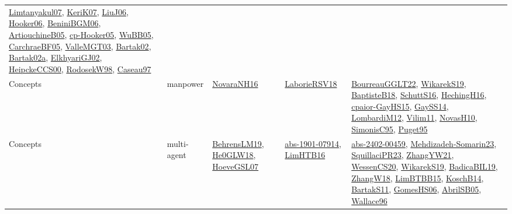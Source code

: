 {\begin{longtable}{lp{3cm}>{\raggedright}p{6cm}>{\raggedright}p{6cm}p{8cm}}
\href{papers/Limtanyakul07.pdf}{Limtanyakul07}\cite{Limtanyakul07}, \href{papers/KeriK07.pdf}{KeriK07}\cite{KeriK07}, \href{papers/LiuJ06.pdf}{LiuJ06}\cite{LiuJ06}, \href{articles/Hooker06.pdf}{Hooker06}\cite{Hooker06}, \href{papers/BeniniBGM06.pdf}{BeniniBGM06}\cite{BeniniBGM06}, \href{papers/ArtiouchineB05.pdf}{ArtiouchineB05}\cite{ArtiouchineB05}, \href{papers/cp-Hooker05.pdf}{cp-Hooker05}\cite{cp-Hooker05}, \href{papers/WuBB05.pdf}{WuBB05}\cite{WuBB05}, \href{papers/CarchraeBF05.pdf}{CarchraeBF05}\cite{CarchraeBF05}, \href{papers/ValleMGT03.pdf}{ValleMGT03}\cite{ValleMGT03}, \href{papers/Bartak02.pdf}{Bartak02}\cite{Bartak02}, \href{papers/Bartak02a.pdf}{Bartak02a}\cite{Bartak02a}, \href{papers/ElkhyariGJ02.pdf}{ElkhyariGJ02}\cite{ElkhyariGJ02}, \href{articles/HeipckeCCS00.pdf}{HeipckeCCS00}\cite{HeipckeCCS00}, \href{papers/RodosekW98.pdf}{RodosekW98}\cite{RodosekW98}, \href{papers/Caseau97.pdf}{Caseau97}\cite{Caseau97}\\
Concepts & manpower & \href{articles/NovaraNH16.pdf}{NovaraNH16}\cite{NovaraNH16} & \href{articles/LaborieRSV18.pdf}{LaborieRSV18}\cite{LaborieRSV18} & \href{articles/BourreauGGLT22.pdf}{BourreauGGLT22}\cite{BourreauGGLT22}, \href{articles/WikarekS19.pdf}{WikarekS19}\cite{WikarekS19}, \href{articles/BaptisteB18.pdf}{BaptisteB18}\cite{BaptisteB18}, \href{papers/SchuttS16.pdf}{SchuttS16}\cite{SchuttS16}, \href{papers/HechingH16.pdf}{HechingH16}\cite{HechingH16}, \href{papers/cpaior-GayHS15.pdf}{cpaior-GayHS15}\cite{cpaior-GayHS15}, \href{papers/GaySS14.pdf}{GaySS14}\cite{GaySS14}, \href{articles/LombardiM12.pdf}{LombardiM12}\cite{LombardiM12}, \href{papers/Vilim11.pdf}{Vilim11}\cite{Vilim11}, \href{articles/NovasH10.pdf}{NovasH10}\cite{NovasH10}, \href{papers/SimonisC95.pdf}{SimonisC95}\cite{SimonisC95}, \href{papers/Puget95.pdf}{Puget95}\cite{Puget95}\\
Concepts & multi-agent & \href{papers/BehrensLM19.pdf}{BehrensLM19}\cite{BehrensLM19}, \href{papers/He0GLW18.pdf}{He0GLW18}\cite{He0GLW18}, \href{papers/HoeveGSL07.pdf}{HoeveGSL07}\cite{HoeveGSL07} & \href{articles/abs-1901-07914.pdf}{abs-1901-07914}\cite{abs-1901-07914}, \href{papers/LimHTB16.pdf}{LimHTB16}\cite{LimHTB16} & \href{articles/abs-2402-00459.pdf}{abs-2402-00459}\cite{abs-2402-00459}, \href{papers/Mehdizadeh-Somarin23.pdf}{Mehdizadeh-Somarin23}\cite{Mehdizadeh-Somarin23}, \href{papers/SquillaciPR23.pdf}{SquillaciPR23}\cite{SquillaciPR23}, \href{articles/ZhangYW21.pdf}{ZhangYW21}\cite{ZhangYW21}, \href{papers/WessenCS20.pdf}{WessenCS20}\cite{WessenCS20}, \href{articles/WikarekS19.pdf}{WikarekS19}\cite{WikarekS19}, \href{papers/BadicaBIL19.pdf}{BadicaBIL19}\cite{BadicaBIL19}, \href{articles/ZhangW18.pdf}{ZhangW18}\cite{ZhangW18}, \href{papers/LimBTBB15.pdf}{LimBTBB15}\cite{LimBTBB15}, \href{papers/KoschB14.pdf}{KoschB14}\cite{KoschB14}, \href{articles/BartakS11.pdf}{BartakS11}\cite{BartakS11}, \href{papers/GomesHS06.pdf}{GomesHS06}\cite{GomesHS06}, \href{papers/AbrilSB05.pdf}{AbrilSB05}\cite{AbrilSB05}, \href{articles/Wallace96.pdf}{Wallace96}\cite{Wallace96}\\

\end{longtable}}
